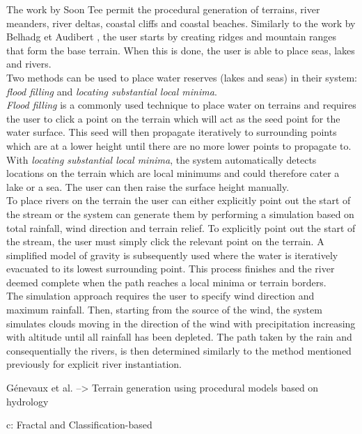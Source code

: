 The work by Soon Tee \cite{Teoh2008} permit the procedural generation of terrains, river meanders, river deltas, coastal cliffs and coastal beaches. Similarly to the work by Belhadg et Audibert \cite{Belhadj2005}, the user starts by creating ridges and mountain ranges that form the base terrain. When this is done, the user is able to place seas, lakes and rivers.\\
Two methods can be used to place water reserves (lakes and seas) in their system: \textit{flood filling} and \textit{locating substantial local minima}.\\ \textit{Flood filling} is a commonly used technique to place water on terrains and requires the user to click a point on the terrain which will act as the seed point for the water surface. This seed will then propagate iteratively to surrounding points which are at a lower height until there are no more lower points to propagate to.\\
With \textit{locating substantial local minima}, the system automatically detects locations on the terrain which are local minimums and could therefore cater a lake or a sea. The user can then raise the surface height manually. \\
To place rivers on the terrain the user can either explicitly point out the start of the stream or the system can generate them by performing a simulation based on total rainfall, wind direction and terrain relief. To explicitly point out the start of the stream, the user must simply click the relevant point on the terrain. A simplified model of gravity is subsequently used where the water is iteratively evacuated to its lowest surrounding point. This process finishes and the river deemed complete when the path reaches a local minima or terrain borders.\\
The simulation approach requires the user to specify wind direction and maximum rainfall. Then, starting from the source of the wind, the system simulates clouds moving in the direction of the wind with precipitation increasing with altitude until all rainfall has been depleted. The path taken by the rain and consequentially the rivers, is then determined similarly to the method mentioned previously for explicit river instantiation. 

Génevaux et al. --> Terrain generation using procedural models based on hydrology

c: Fractal and Classification-based

